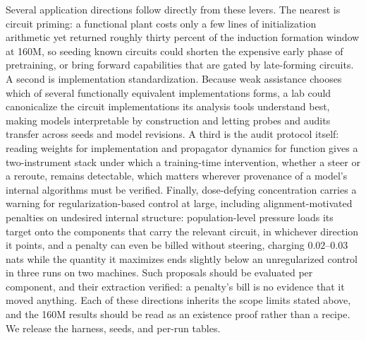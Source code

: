 \documentclass[11pt]{article}
\begin{document}
Several application directions follow directly from these levers. The nearest is circuit priming: a functional
plant costs only a few lines of initialization arithmetic yet returned roughly thirty percent of the induction
formation window at 160M, so seeding known circuits could shorten the expensive early phase of pretraining, or
bring forward capabilities that are gated by late-forming circuits. A second is implementation standardization.
Because weak assistance chooses which of several functionally equivalent implementations forms, a lab could
canonicalize the circuit implementations its analysis tools understand best, making models interpretable by
construction and letting probes and audits transfer across seeds and model revisions. A third is the audit
protocol itself: reading weights for implementation and propagator dynamics for function gives a two-instrument
stack under which a training-time intervention, whether a steer or a reroute, remains detectable, which matters
wherever provenance of a model's internal algorithms must be verified. Finally, dose-defying concentration carries
a warning for regularization-based control at large, including alignment-motivated penalties on undesired
internal structure: population-level pressure loads its target onto the components that carry the relevant
circuit, in whichever direction it points, and a penalty can even be billed without steering, charging
$0.02$--$0.03$ nats while the quantity it maximizes ends slightly below an unregularized control in three runs on
two machines. Such proposals should be evaluated per component, and their extraction verified: a penalty's bill
is no evidence that it moved anything.
Each of these directions inherits the scope limits stated above, and the 160M results should be read as an
existence proof rather than a recipe. We release the harness, seeds, and per-run tables.
\end{document}
